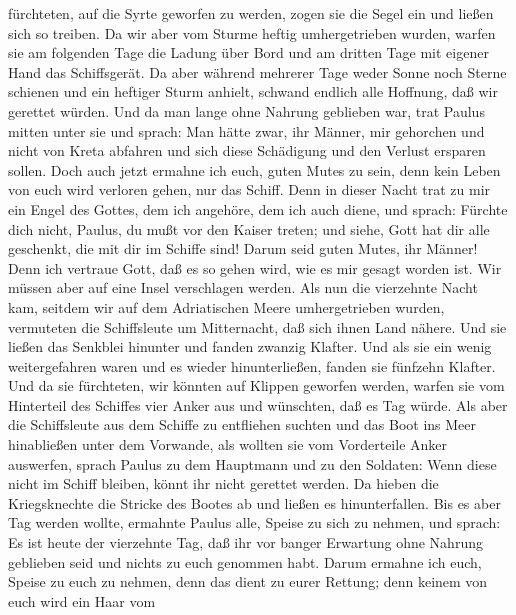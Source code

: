 fürchteten, auf die Syrte geworfen zu werden, zogen sie die Segel ein
und ließen sich so treiben.  Da wir aber vom Sturme
heftig umhergetrieben wurden, warfen sie am folgenden Tage die Ladung
über Bord  und am dritten Tage mit eigener Hand das
Schiffsgerät.  Da aber während mehrerer Tage weder Sonne
noch Sterne schienen und ein heftiger Sturm anhielt, schwand endlich
alle Hoffnung, daß wir gerettet würden.  Und da man lange
ohne Nahrung geblieben war, trat Paulus mitten unter sie und sprach: Man
hätte zwar, ihr Männer, mir gehorchen und nicht von Kreta abfahren und
sich diese Schädigung und den Verlust ersparen sollen. 
Doch auch jetzt ermahne ich euch, guten Mutes zu sein, denn kein Leben
von euch wird verloren gehen, nur das Schiff.  Denn in
dieser Nacht trat zu mir ein Engel des Gottes, dem ich angehöre, dem ich
auch diene,  und sprach: Fürchte dich nicht, Paulus, du
mußt vor den Kaiser treten; und siehe, Gott hat dir alle geschenkt, die
mit dir im Schiffe sind!  Darum seid guten Mutes, ihr
Männer! Denn ich vertraue Gott, daß es so gehen wird, wie es mir gesagt
worden ist.  Wir müssen aber auf eine Insel verschlagen
werden.  Als nun die vierzehnte Nacht kam, seitdem wir
auf dem Adriatischen Meere umhergetrieben wurden, vermuteten die
Schiffsleute um Mitternacht, daß sich ihnen Land nähere. 
Und sie ließen das Senkblei hinunter und fanden zwanzig Klafter. Und als
sie ein wenig weitergefahren waren und es wieder hinunterließen, fanden
sie fünfzehn Klafter.  Und da sie fürchteten, wir könnten
auf Klippen geworfen werden, warfen sie vom Hinterteil des Schiffes vier
Anker aus und wünschten, daß es Tag würde.  Als aber die
Schiffsleute aus dem Schiffe zu entfliehen suchten und das Boot ins Meer
hinabließen unter dem Vorwande, als wollten sie vom Vorderteile Anker
auswerfen,  sprach Paulus zu dem Hauptmann und zu den
Soldaten: Wenn diese nicht im Schiff bleiben, könnt ihr nicht gerettet
werden.  Da hieben die Kriegsknechte die Stricke des
Bootes ab und ließen es hinunterfallen.  Bis es aber Tag
werden wollte, ermahnte Paulus alle, Speise zu sich zu nehmen, und
sprach: Es ist heute der vierzehnte Tag, daß ihr vor banger Erwartung
ohne Nahrung geblieben seid und nichts zu euch genommen habt.
 Darum ermahne ich euch, Speise zu euch zu nehmen, denn
das dient zu eurer Rettung; denn keinem von euch wird ein Haar vom
